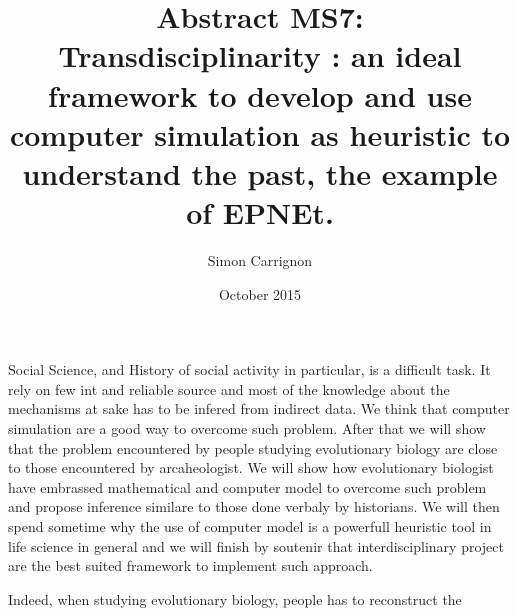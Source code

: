\documentclass[a4paper]{article}
\title{Abstract MS7:\\ Transdisciplinarity : an ideal framework to develop and use computer simulation as heuristic to understand the past, the example of EPNEt.}
\author{Simon Carrignon}
\date{October 2015}
\begin{document}
Social Science, and History of social activity in particular, is a difficult task. It rely on few int and reliable source and most of the knowledge about the mechanisms at sake has to be infered from indirect data.
We think that computer simulation are a good way to overcome such problem.  After that we will show that the problem encountered by people studying evolutionary biology are close to those encountered by arcaheologist. We will show how evolutionary biologist have embrassed mathematical and computer model to overcome such problem and propose inference similare to those done verbaly by historians. We will then spend sometime why the use of computer model is a powerfull heuristic tool in life science in general and we will finish by soutenir that interdisciplinary project are the best suited framework to implement such approach.

Indeed, when studying evolutionary biology, people has to reconstruct the 
\end{document}
